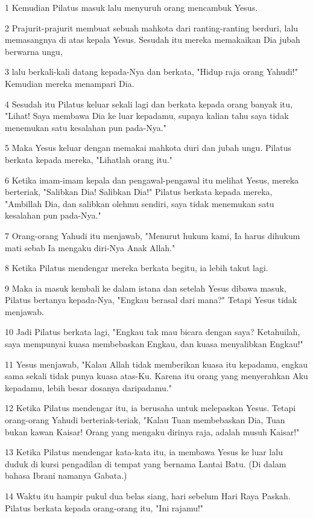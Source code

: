 \par 1 Kemudian Pilatus masuk lalu menyuruh orang mencambuk Yesus.
\par 2 Prajurit-prajurit membuat sebuah mahkota dari ranting-ranting berduri, lalu memasangnya di atas kepala Yesus. Sesudah itu mereka memakaikan Dia jubah berwarna ungu,
\par 3 lalu berkali-kali datang kepada-Nya dan berkata, "Hidup raja orang Yahudi!" Kemudian mereka menampari Dia.
\par 4 Sesudah itu Pilatus keluar sekali lagi dan berkata kepada orang banyak itu, "Lihat! Saya membawa Dia ke luar kepadamu, supaya kalian tahu saya tidak menemukan satu kesalahan pun pada-Nya."
\par 5 Maka Yesus keluar dengan memakai mahkota duri dan jubah ungu. Pilatus berkata kepada mereka, "Lihatlah orang itu."
\par 6 Ketika imam-imam kepala dan pengawal-pengawal itu melihat Yesus, mereka berteriak, "Salibkan Dia! Salibkan Dia!" Pilatus berkata kepada mereka, "Ambillah Dia, dan salibkan olehmu sendiri, saya tidak menemukan satu kesalahan pun pada-Nya."
\par 7 Orang-orang Yahudi itu menjawab, "Menurut hukum kami, Ia harus dihukum mati sebab Ia mengaku diri-Nya Anak Allah."
\par 8 Ketika Pilatus mendengar mereka berkata begitu, ia lebih takut lagi.
\par 9 Maka ia masuk kembali ke dalam istana dan setelah Yesus dibawa masuk, Pilatus bertanya kepada-Nya, "Engkau berasal dari mana?" Tetapi Yesus tidak menjawab.
\par 10 Jadi Pilatus berkata lagi, "Engkau tak mau bicara dengan saya? Ketahuilah, saya mempunyai kuasa membebaskan Engkau, dan kuasa menyalibkan Engkau!"
\par 11 Yesus menjawab, "Kalau Allah tidak memberikan kuasa itu kepadamu, engkau sama sekali tidak punya kuasa atas-Ku. Karena itu orang yang menyerahkan Aku kepadamu, lebih besar dosanya daripadamu."
\par 12 Ketika Pilatus mendengar itu, ia berusaha untuk melepaskan Yesus. Tetapi orang-orang Yahudi berteriak-teriak, "Kalau Tuan membebaskan Dia, Tuan bukan kawan Kaisar! Orang yang mengaku dirinya raja, adalah musuh Kaisar!"
\par 13 Ketika Pilatus mendengar kata-kata itu, ia membawa Yesus ke luar lalu duduk di kursi pengadilan di tempat yang bernama Lantai Batu. (Di dalam bahasa Ibrani namanya Gabata.)
\par 14 Waktu itu hampir pukul dua belas siang, hari sebelum Hari Raya Paskah. Pilatus berkata kepada orang-orang itu, "Ini rajamu!"

